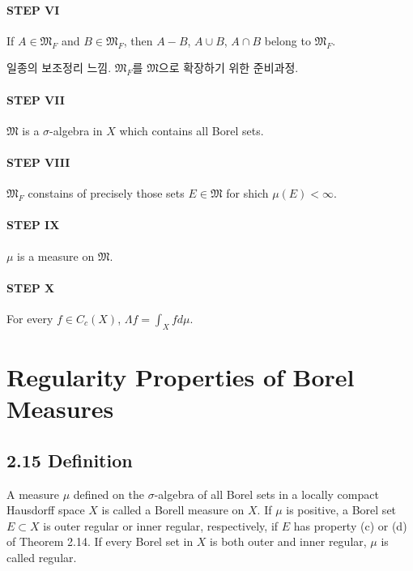 \documentclass[11pt,reqno]{amsart}
\renewcommand{\(}{\left(}
\renewcommand{\)}{\right)}
\renewcommand{\[}{\left[}
\renewcommand{\]}{\right]}
\newcommand{\M}{\mathfrak{M}}
\begin{document}
\paragraph{STEP VI}

If $A \in \M_F$ and $B \in \M_F$, then $A - B$, $A \cup B$, $A \cap B$ belong to $\M_F$.

일종의 보조정리 느낌. $\M_F$를 $\M$으로 확장하기 위한 준비과정.

\paragraph{STEP VII}

$\M$ is a $\sigma$-algebra in $X$ which contains all Borel sets.

\paragraph{STEP VIII}

$\M_F$ constains of precisely those sets $E \in \M$ for shich $\mu(E) < \infty$.

\paragraph{STEP IX}

$\mu$ is a measure on $\M$.

\paragraph{STEP X}

For every $f \in C_c (X)$, $\Lambda f = \int _X f d\mu$.

\section{Regularity Properties of Borel Measures}

\subsection{2.15 Definition}

A measure $\mu$ defined on the $\sigma$-algebra of all Borel sets in a locally compact Hausdorff space $X$ is called a Borell measure
on $X$. If $\mu$ is positive, a Borel set $E \subset X$ is outer regular or inner regular, respectively, if $E$ has property (c) or (d)
of Theorem 2.14. If every Borel set in $X$ is both outer and inner regular, $\mu$ is called regular.
\end{document}
